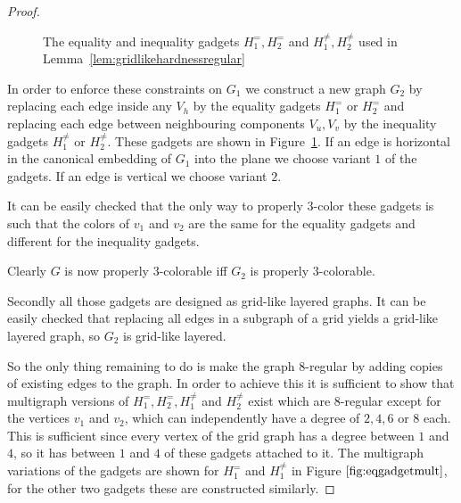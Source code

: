 \begin{proof}
\begin{figure}[tpb]

        \caption{The equality and inequality gadgets $H^=_1, H^=_2$ and $H^{\neq}_1, H^{\neq}_2$ used in Lemma~\ref{lem:gridlikehardnessregular}}
        \label{fig:eqneqgadget}
    \end{figure}

    In order to enforce these constraints on $G_1$ we construct a new graph $G_2$ by replacing each edge inside any $V_h$ by the equality gadgets $H^=_1$ or $H^=_2$ and replacing each edge between neighbouring components $V_u, V_v$ by the inequality gadgets $H^{\neq}_1$ or $H^{\neq}_2$.
    These gadgets are shown in Figure~\ref{fig:eqneqgadget}.
    If an edge is horizontal in the canonical embedding of $G_1$ into the plane we choose variant $1$ of the gadgets. If an edge is vertical we choose variant $2$.

    It can be easily checked that the only way to properly $3$-color these gadgets is such that the colors of $v_1$ and $v_2$ are the same for the equality gadgets and different for the inequality gadgets.
    
    Clearly $G$ is now properly $3$-colorable iff $G_2$ is properly $3$-colorable.

    Secondly all those gadgets are designed as grid-like layered graphs.
    It can be easily checked that replacing all edges in a subgraph of a grid yields a grid-like layered graph, so $G_2$ is grid-like layered.

    So the only thing remaining to do is make the graph $8$-regular by adding copies of existing edges to the graph.
    In order to achieve this it is sufficient to show that multigraph versions of $H^=_1, H^=_2, H^{\neq}_1$ and $H^{\neq}_2$ exist which are $8$-regular except for the vertices $v_1$ and $v_2$, which can independently have a degree of $2, 4, 6$ or $8$ each.
    This is sufficient since every vertex of the grid graph has a degree between $1$ and $4$, so it has between $1$ and $4$ of these gadgets attached to it.
    The multigraph variations of the gadgets are shown for $H^=_1$ and $H^{\neq}_1$ in Figure $\ref{fig:eqgadgetmult}$, for the other two gadgets these are constructed similarly.


\end{proof}
